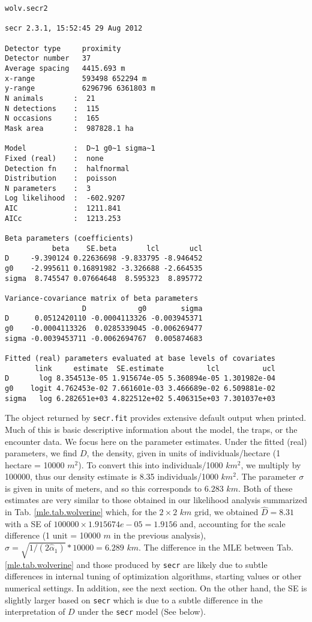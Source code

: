 {\small
\begin{verbatim}
wolv.secr2

secr 2.3.1, 15:52:45 29 Aug 2012

Detector type     proximity 
Detector number   37 
Average spacing   4415.693 m 
x-range           593498 652294 m 
y-range           6296796 6361803 m 
N animals       :  21  
N detections    :  115 
N occasions     :  165 
Mask area       :  987828.1 ha 

Model           :  D~1 g0~1 sigma~1 
Fixed (real)    :  none 
Detection fn    :  halfnormal 
Distribution    :  poisson 
N parameters    :  3 
Log likelihood  :  -602.9207 
AIC             :  1211.841 
AICc            :  1213.253 

Beta parameters (coefficients) 
           beta    SE.beta       lcl       ucl
D     -9.390124 0.22636698 -9.833795 -8.946452
g0    -2.995611 0.16891982 -3.326688 -2.664535
sigma  8.745547 0.07664648  8.595323  8.895772

Variance-covariance matrix of beta parameters 
                  D            g0        sigma
D      0.0512420110 -0.0004113326 -0.003945371
g0    -0.0004113326  0.0285339045 -0.006269477
sigma -0.0039453711 -0.0062694767  0.005874683

Fitted (real) parameters evaluated at base levels of covariates 
       link     estimate  SE.estimate          lcl          ucl
D       log 8.354513e-05 1.915674e-05 5.360894e-05 1.301982e-04
g0    logit 4.762453e-02 7.661601e-03 3.466689e-02 6.509881e-02
sigma   log 6.282651e+03 4.822512e+02 5.406315e+03 7.301037e+03
\end{verbatim}
}

The object returned by \mbox{\tt secr.fit} provides extensive default
output when printed. Much of this is basic descriptive information
about the model, the traps, or the encounter data. We focus here on
the parameter estimates.
Under the fitted (real) parameters, we find $D$, the density, given in
units of individuals/hectare (1 hectare = 10000 $m^2$).  To convert this
into individuals/1000 $km^2$, we multiply by 100000, thus our density
estimate is 8.35 individuals/1000 $km^2$.  The parameter $\sigma$ is given in units of
meters, and so this corresponds to
 $6.283$ $km$.  Both of these estimates are very similar to those
obtained in our likelihood analysis summarized in Tab. \ref{mle.tab.wolverine}
which, for the $2 \times 2$ $km$ grid, we obtained $\hat{D} = 8.31$
with a SE of $100000 \times 
1.915674e-05 = 1.9156$
and, accounting for the scale difference (1 unit = 10000 $m$ in the
previous analysis), $\hat{\sigma} = \sqrt{1/(2\hat{\alpha}_{1})}*10000
= 6.289$ $km$. 
The difference in the MLE between Tab. \ref{mle.tab.wolverine} and those
produced by \mbox{\tt secr} are likely due to subtle differences in  internal
tuning of optimization algorithms, starting values or other numerical
settings. In addition, see the next section.
On the other hand, the SE is slightly larger based on \mbox{\tt secr}
which is due to a subtle difference in the interpretation of $D$ under
the \mbox{\tt secr} model (See below). 







